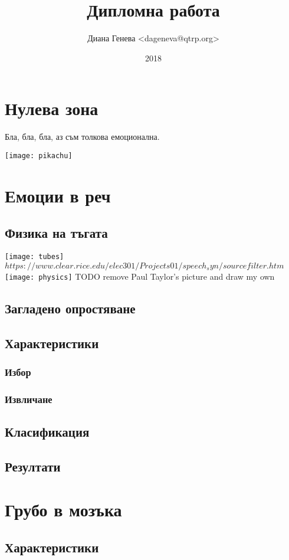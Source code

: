 \documentclass[12pt]{report}
\title{Дипломна работа}
\author{Диана Генева <dageneva@qtrp.org>}
\date{2018}
\begin{document}
\maketitle
\thispagestyle{empty}
\tableofcontents
\pagebreak

\chapter{Нулева зона}
Бла, бла, бла, аз съм толкова емоционална.

\texttt{[image: pikachu]}

\chapter{Емоции в реч}
    \section{Физика на тъгата}
    \texttt{[image: tubes]}
    $https://www.clear.rice.edu/elec301/Projects01/speech_syn/sourcefilter.htm$
    \texttt{[image: physics]}
    TODO remove Paul Taylor's picture and draw my own
    \section{Загладено опростяване}    
    \section{Характеристики}
        \subsection{Избор}
        \subsection{Извличане}
    \section{Класификация}    
    \section{Резултати}

\chapter{Грубо в мозъка}
    \section{Характеристики}
\end{document}
